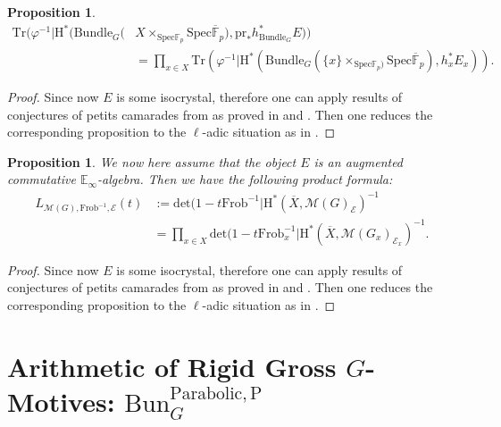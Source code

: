 \documentclass[11pt]{book}
\newtheorem{proposition}[theorem]{Proposition}
\theoremstyle{definition}
\numberwithin{equation}{section}
\begin{document}
\begin{proposition}
\begin{align}
\mathrm{Tr}(\varphi^{-1}|\mathrm{H}^*(\mathrm{Bundle}_G(&X\times_{\mathrm{Spec}\mathbb{F}_p} \mathrm{Spec}\overline{\mathbb{F}}_p),\mathrm{pr}_*h_{\mathrm{Bundle}_G}^*E))\\
&=\prod_{x\in X} \mathrm{Tr}(\varphi^{-1}|\mathrm{H}^*(\mathrm{Bundle}_G(\{x\}\times_{\mathrm{Spec}\mathbb{F}_p)} \mathrm{Spec}\overline{\mathbb{F}}_p),h_x^*{E}_x)).	
\end{align}
\end{proposition}

\begin{proof}
Since now $E$ is some isocrystal, therefore one can apply results of conjectures of petits camarades from \cite[Conjecture 1.2.10]{De1} as proved in \cite{Ked11} and \cite[Theorem 0.1.1, Theorem 0.1.2]{Ked12}. Then one reduces the corresponding proposition to the $\ell$-adic situation as in \cite[Theorem 1.4.4.1]{GL1}.	
\end{proof}



\begin{proposition}
We now here assume that the object $E$ is an augmented commutative $\mathbb{E}_\infty$-algebra. Then we have the following product formula:
\begin{align}
L_{\mathcal{M}(G),\mathrm{Frob}^{-1},\mathcal{E}}(t)&:=\mathrm{det}(1-t\mathrm{Frob}^{-1}|\mathrm{H}^*(\overline{X},\mathcal{M}(G)_\mathcal{E})^{-1}\\
&=\prod_{x\in X}\mathrm{det}(1-t\mathrm{Frob}_x^{-1}|\mathrm{H}^*(\overline{X},\mathcal{M}(G_x)_{\mathcal{E}_x})^{-1}.
\end{align}
\end{proposition}

\begin{proof}
Since now $E$ is some isocrystal, therefore one can apply results of conjectures of petits camarades from \cite[Conjecture 1.2.10]{De1} as proved in \cite{Ked11} and \cite[Theorem 0.1.1, Theorem 0.1.2]{Ked12}. Then one reduces the corresponding proposition to the $\ell$-adic situation as in \cite[Theorem 4.5.3.1]{GL1}.	
\end{proof}




\newpage
\section{Arithmetic of Rigid Gross $G$-Motives: $\mathrm{Bun}^\mathrm{Parabolic,P}_G$}
\end{document}
